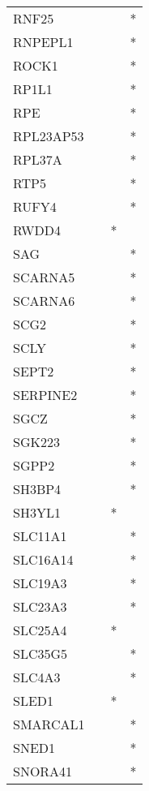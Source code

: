 \begin{longtable}{lccc}
RNF25          &       &    &       * \\
RNPEPL1        &       &    &       * \\
ROCK1          &       &    &       * \\
RP1L1          &       &    &       * \\
RPE            &       &    &       * \\
RPL23AP53      &       &    &       * \\
RPL37A         &       &    &       * \\
RTP5           &       &    &       * \\
RUFY4          &       &    &       * \\
RWDD4          &       &  * &         \\
SAG            &       &    &       * \\
SCARNA5        &       &    &       * \\
SCARNA6        &       &    &       * \\
SCG2           &       &    &       * \\
SCLY           &       &    &       * \\
SEPT2          &       &    &       * \\
SERPINE2       &       &    &       * \\
SGCZ           &       &    &       * \\
SGK223         &       &    &       * \\
SGPP2          &       &    &       * \\
SH3BP4         &       &    &       * \\
SH3YL1         &       &  * &         \\
SLC11A1        &       &    &       * \\
SLC16A14       &       &    &       * \\
SLC19A3        &       &    &       * \\
SLC23A3        &       &    &       * \\
SLC25A4        &       &  * &         \\
SLC35G5        &       &    &       * \\
SLC4A3         &       &    &       * \\
SLED1          &       &  * &         \\
SMARCAL1       &       &    &       * \\
SNED1          &       &    &       * \\
SNORA41        &       &    &       * \\

\end{longtable}
